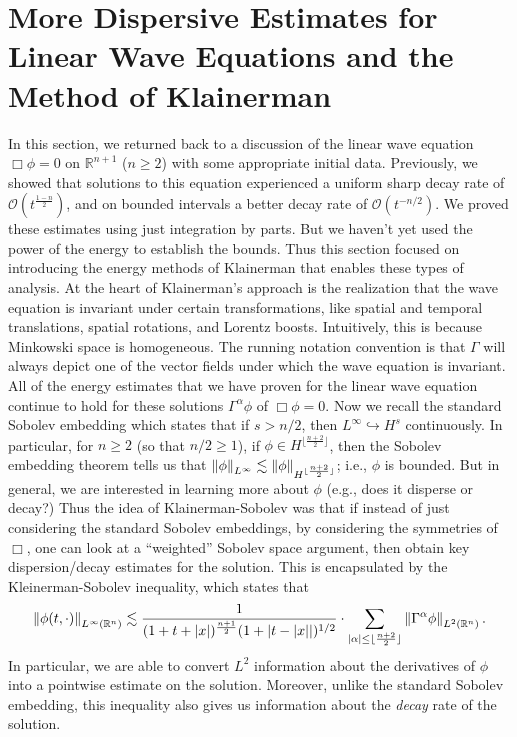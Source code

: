 \documentclass{article}
\begin{document}
	
	\section{More Dispersive Estimates for Linear Wave Equations and the Method of Klainerman}
	
	In this section, we returned back to a discussion of the linear wave equation $\Box\phi = 0$ on $\mathbb{R}^{n + 1}$ ($n \geq 2$) with some appropriate initial data. Previously, we showed that solutions to this equation experienced a uniform sharp decay rate of $\mathcal{O}(t^{\frac{1 - n}{2}})$, and on bounded intervals a better decay rate of $\mathcal{O}(t^{-n/2})$. We proved these estimates using just integration by parts. But we haven't yet used the power of the energy to establish the bounds. Thus this section focused on introducing the energy methods of Klainerman that enables these types of analysis. At the heart of Klainerman's approach is the realization that the wave equation is invariant under certain transformations, like spatial and temporal translations, spatial rotations, and Lorentz boosts. Intuitively, this is because Minkowski space is homogeneous. The running notation convention is that $\Gamma$ will always depict one of the vector fields under which the wave equation is invariant. All of the energy estimates that we have proven for the linear wave equation continue to hold for these solutions $\Gamma^{\alpha}\phi$ of $\Box\phi = 0$. Now we recall the standard Sobolev embedding which states that if $s > n/2$, then $L^{\infty} \hookrightarrow H^{s}$ continuously. In particular, for $n \geq 2$ (so that $n/2 \geq 1$), if $\phi \in H^{\lfloor \frac{n + 2}{2}\rfloor}$, then the Sobolev embedding theorem tells us that $\left\Vert \phi \right\Vert_{L^{\infty}} \lesssim \left\Vert \phi \right\Vert_{H^{\lfloor \frac{n + 2}{2}\rfloor}}$; i.e., $\phi$ is bounded. But in general, we are interested in learning more about $\phi$ (e.g., does it disperse or decay?) Thus the idea of Klainerman-Sobolev was that if instead of just considering the standard Sobolev embeddings, by considering the symmetries of $\Box$, one can look at a ``weighted'' Sobolev space argument, then  obtain key dispersion/decay estimates for the solution. This is encapsulated by the Kleinerman-Sobolev inequality, which states that 
	\begin{equation*}
		\left\Vert \phi(t,\cdot) \right\Vert_{L^{\infty}(\mathbb{R}^{n})}\lesssim \frac{1}{(1 + t + |x|)^{\frac{n + 1}{2}}(1 + |t - |x||)^{1/2}}\cdot \sum_{|\alpha|\leq \lfloor \frac{n + 2}{2}\rfloor}\left\Vert \Gamma^{\alpha}\phi \right\Vert_{L^{2}(\mathbb{R}^{n})}. 
	\end{equation*}
	In particular, we are able to convert $L^{2}$ information about the derivatives of $\phi$ into a pointwise estimate on the solution. Moreover, unlike the standard Sobolev embedding, this inequality also gives us information about the \textit{decay} rate of the solution. 
	
\end{document}
